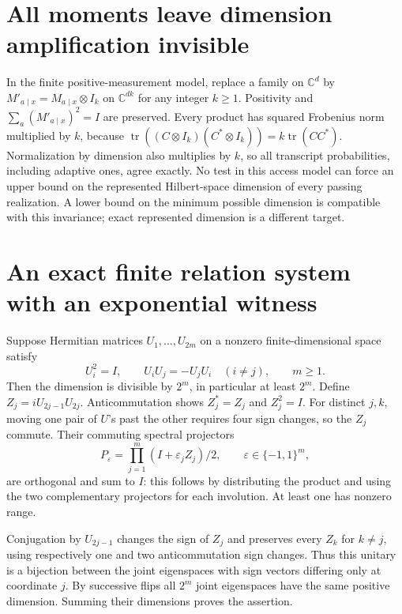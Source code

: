 \documentclass[11pt]{article}
\begin{document}
\section{All moments leave dimension amplification invisible}
In the finite positive-measurement model, replace a family on
$\mathbb C^d$ by $M'_{a\mid x}=M_{a\mid x}\otimes I_k$ on
$\mathbb C^{dk}$ for any integer $k\ge1$. Positivity and
$\sum_a(M'_{a\mid x})^2=I$ are preserved. Every product has
squared Frobenius norm multiplied by $k$, because
$\operatorname{tr}((C\otimes I_k)(C^*\otimes I_k))
=k\operatorname{tr}(CC^*)$. Normalization by dimension also
multiplies by $k$, so all transcript probabilities, including
adaptive ones, agree exactly. No test in this access model can
force an upper bound on the represented Hilbert-space dimension
of every passing realization. A lower bound on the minimum
possible dimension is compatible with this invariance; exact
represented dimension is a different target.

\section{An exact finite relation system with an exponential witness}
Suppose Hermitian matrices $U_1,\ldots,U_{2m}$ on a nonzero
finite-dimensional space satisfy
\[
 U_i^2=I,\qquad U_iU_j=-U_jU_i\quad(i\ne j),\qquad m\ge1.
\]
Then the dimension is divisible by $2^m$, in particular at least
$2^m$. Define $Z_j=iU_{2j-1}U_{2j}$. Anticommutation shows
$Z_j^*=Z_j$ and $Z_j^2=I$. For distinct $j,k$, moving one
pair of $U$'s past the other requires four sign changes, so the
$Z_j$ commute. Their commuting spectral projectors
\[
 P_\varepsilon=\prod_{j=1}^m(I+\varepsilon_jZ_j)/2,
 \qquad\varepsilon\in\{-1,1\}^m,
\]
are orthogonal and sum to $I$: this follows by distributing the
product and using the two complementary projectors for each
involution. At least one has nonzero range.

Conjugation by $U_{2j-1}$ changes the sign of $Z_j$ and preserves
every $Z_k$ for $k\ne j$, using respectively one and two
anticommutation sign changes. Thus this unitary is a bijection
between the joint eigenspaces with sign vectors differing only
at coordinate $j$. By successive flips all $2^m$ joint
eigenspaces have the same positive dimension. Summing their
dimensions proves the assertion.
\end{document}
